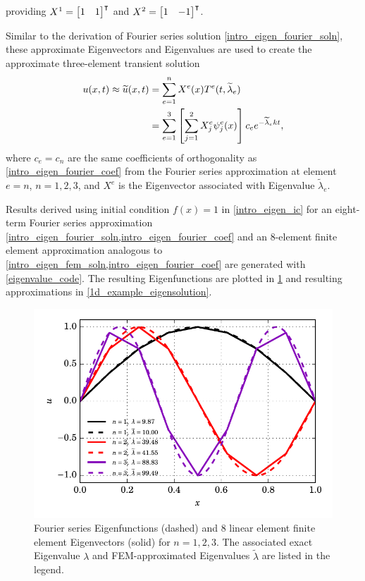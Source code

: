 providing $X^1 = \begin{bmatrix} 1 & 1 \end{bmatrix}^\intercal$ and $X^2 = \begin{bmatrix} 1 & -1 \end{bmatrix}^\intercal$.

Similar to the derivation of Fourier series solution \cref{intro_eigen_fourier_soln}, these approximate Eigenvectors and Eigenvalues are used to create the approximate three-element transient solution
\begin{align}
  u(x,t) \approx \widetilde{u}(x,t) &= \sum_{e=1}^n X^e(x) T^e(t, \widetilde{\lambda}_e) \notag \\
  \label{intro_eigen_fem_soln}
  &= \sum_{e=1}^3 \left[ \sum_{j=1}^2 X^e_j \psi_j^e(x) \right] c_e e^{-\widetilde{\lambda}_e k t},
\end{align}
where $c_e = c_n$ are the same coefficients of orthogonality as \cref{intro_eigen_fourier_coef} from the Fourier series approximation at element $e = n$, $n=1,2,3$, and $X^e$ is the Eigenvector associated with Eigenvalue $\widetilde{\lambda}_e$.

Results derived using initial condition $f(x) = 1$ in \cref{intro_eigen_ic} for an eight-term Fourier series approximation \cref{intro_eigen_fourier_soln,intro_eigen_fourier_coef} and an 8-element finite element approximation analogous to \cref{intro_eigen_fem_soln,intro_eigen_fourier_coef} are generated with \cref{eigenvalue_code}.
The resulting Eigenfunctions are plotted in \cref{1d_example_eigenvectors} and resulting approximations in \cref{1d_example_eigensolution}.


\begin{figure}
  \centering
    \includegraphics[width=0.7\linewidth]{images/fenics_intro/eigenvectors.pdf}
  \caption[Eigenvector example solution]{Fourier series Eigenfunctions (dashed) and 8 linear element finite element Eigenvectors (solid) for $n=1,2,3$.  The associated exact Eigenvalue $\lambda$ and FEM-approximated Eigenvalues $\tilde{\lambda}$ are listed in the legend.}
  \label{1d_example_eigenvectors}
\end{figure}

